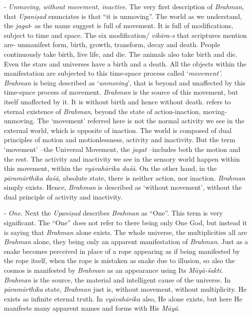 - \emph{Unmoving, without movement, inactive}. The very first description of \emph{Brahman}, that \emph{Upaniṣad} enunciates is that ``it is unmoving''. The world as we understand, the \emph{jagat}- as the name suggest is full of movement. It is full of modifications, subject to time and space. The six modification/ \emph{vikāra-s} that scriptures mention are- unmanifest form, birth, growth, transform, decay and death. People continuously take birth, live life, and die. The animals also take birth and die. Even the stars and universes have a birth and a death. All the objects within the manifestation are subjected to this time-space process called `\emph{movement'}. \emph{Brahman} is being described as `\emph{unmoving}', that is beyond and unaffected by this time-space process of movement. \emph{Brahman} is the source of this movement, but itself unaffected by it. It is without birth and hence without death.  refers to eternal existence of \emph{Brahman}, beyond the state of action-inaction, moving-unmoving. The `movement' referred here is not the normal activity we see in the external world, which is opposite of inaction. The world is composed of dual principles of motion and motionlessness, activity and inactivity. But the term `movement' --the Universal Movement, the \emph{jagat} --includes both the motion and the rest. The activity and inactivity we see in the sensory world happen within this movement, within the \emph{vyāvahārika daśā}. On the other hand, in the \emph{pāramārthika daśā}, absolute state, there is neither action, nor inaction. \emph{Brahman} simply exists. Hence, \emph{Brahman} is described as `without movement', without the dual principle of activity and inactivity.

- \emph{One}. Next the \emph{Upaniṣad} describes \emph{Brahman} as ``One''. This term is very significant. The ``One'' does not refer to there being only One God, but instead it is saying that \emph{Brahman} alone exists. The whole universe, the multiplicities all are \emph{Brahman} alone, they being only an apparent manifestation of \emph{Brahman}. Just as a snake becomes perceived in place of a rope appearing as if being manifested by the rope itself, when the rope is mistaken as snake due to illusion, so also the cosmos is manifested by \emph{Brahman} as an appearance using Its \emph{Māyā-śakti}. \emph{Brahman} is the source, the material and intelligent cause of the universe. In \emph{pāramārthika} state, \emph{Brahman} just is, without movement, without multiplicity. He exists as infinite eternal truth. In \emph{vyāvahārika} also, He alone exists, but here He manifests many apparent names and forms with His \emph{Māyā}.

